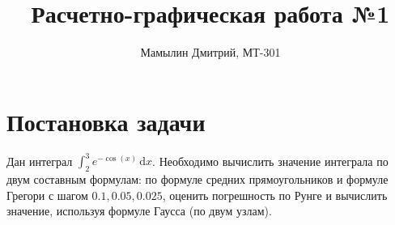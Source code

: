 \documentclass[12pt,a4paper]{article}
\title{Расчетно-графическая работа №1}
\author{Мамылин Дмитрий, МТ-301}
\begin{document}
\maketitle
\thispagestyle{empty}

\newpage
\thispagestyle{empty}

    \section*{Постановка задачи}
        Дан интеграл $\int_2^3 \! e^{-\cos(x)} \, \mathrm{d}x$.
        Необходимо вычислить значение интеграла по двум составным формулам:
        по формуле средних прямоугольников и формуле Грегори с шагом
        $0.1, 0.05, 0.025$, оценить погрешность по Рунге и вычислить
        значение, используя формуле Гаусса (по двум узлам). \\
        
\end{document}
